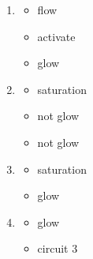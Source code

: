 \documentclass[
  letterpaper,
  DIV=11,
  numbers=noendperiod,
  oneside]{scrartcl}
\providecommand{\tightlist}{%
  \setlength{\itemsep}{0pt}\setlength{\parskip}{0pt}}\usepackage{longtable,booktabs,array}
\begin{document}
\begin{enumerate}
\def\labelenumi{\arabic{enumi}.}
\item
  \begin{itemize}
  \tightlist
  \item
    flow
  \item
    activate
  \item
    glow
  \end{itemize}
\item
  \begin{itemize}
  \tightlist
  \item
    saturation
  \item
    not glow
  \item
    not glow
  \end{itemize}
\item
  \begin{itemize}
  \tightlist
  \item
    saturation
  \item
    glow
  \end{itemize}
\item
  \begin{itemize}
  \item
    glow
  \item
    circuit 3
  \end{itemize}
\end{enumerate}
\end{document}
